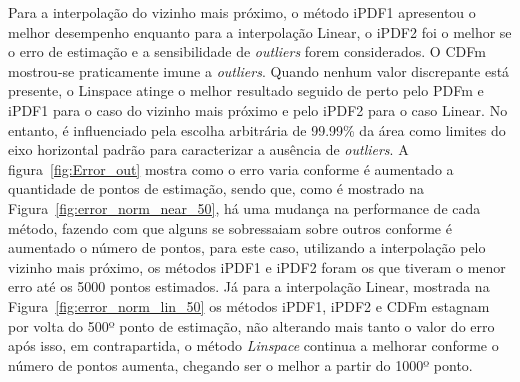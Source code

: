 Para a interpolação do vizinho mais próximo, o método \ac{iPDF1} apresentou o melhor desempenho enquanto para a interpolação Linear, o \ac{iPDF2} foi o melhor se o erro de estimação e a sensibilidade de \textit{outliers} forem considerados. O \ac{CDFm} mostrou-se praticamente imune a \textit{outliers}. Quando nenhum valor discrepante está presente, o Linspace atinge o melhor resultado seguido de perto pelo \ac{PDFm} e \ac{iPDF1} para o caso do vizinho mais próximo e pelo \ac{iPDF2} para o caso Linear. No entanto, é influenciado pela escolha arbitrária de 99.99\% da área como limites do eixo horizontal padrão para caracterizar a ausência de \textit{outliers}. 
A figura~\ref{fig:Error_out} mostra como o erro varia conforme é aumentado a quantidade de pontos de estimação, sendo que, como é mostrado na Figura~\ref{fig:error_norm_near_50}, há uma mudança na performance de cada método, fazendo com que alguns se sobressaiam sobre outros conforme é aumentado o número de pontos, para este caso, utilizando a interpolação pelo vizinho mais próximo, os métodos \ac{iPDF1} e \ac{iPDF2} foram os que tiveram o menor erro até os 5000 pontos estimados. Já para a interpolação Linear, mostrada na Figura~\ref{fig:error_norm_lin_50} os métodos \ac{iPDF1}, \ac{iPDF2} e \ac{CDFm} estagnam por volta do 500º ponto de estimação, não alterando mais tanto o valor do erro após isso, em contrapartida, o método \textit{Linspace} continua a melhorar conforme o número de pontos aumenta, chegando ser o melhor a partir do 1000º ponto.
 

